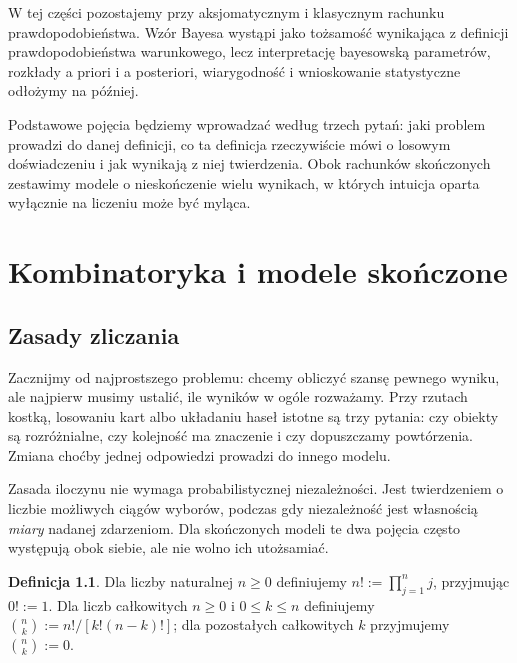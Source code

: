 \documentclass[11pt,a4paper,oneside]{report}
\numberwithin{equation}{chapter}
\theoremstyle{plain}
\theoremstyle{definition}
\newtheorem{definicja}{Definicja}[chapter]
\theoremstyle{remark}
\begin{document}
W tej części pozostajemy przy aksjomatycznym i klasycznym rachunku
prawdopodobieństwa. Wzór Bayesa wystąpi jako tożsamość wynikająca
z definicji prawdopodobieństwa warunkowego, lecz interpretację
bayesowską parametrów, rozkłady a priori i a posteriori,
wiarygodność i wnioskowanie statystyczne odłożymy na później.

Podstawowe pojęcia będziemy wprowadzać według trzech pytań: jaki
problem prowadzi do danej definicji, co ta definicja rzeczywiście
mówi o losowym doświadczeniu i jak wynikają z niej twierdzenia.
Obok rachunków skończonych zestawimy modele o nieskończenie
wielu wynikach, w których intuicja oparta wyłącznie na liczeniu
może być myląca.

\chapter{Kombinatoryka i modele skończone}
\label{ch:combinatorics}

\section{Zasady zliczania}
Zacznijmy od najprostszego problemu: chcemy obliczyć szansę
pewnego wyniku, ale najpierw musimy ustalić, ile wyników w ogóle
rozważamy. Przy rzutach kostką, losowaniu kart albo układaniu haseł
istotne są trzy pytania: czy obiekty są rozróżnialne, czy kolejność
ma znaczenie i czy dopuszczamy powtórzenia. Zmiana choćby jednej
odpowiedzi prowadzi do innego modelu.

Zasada iloczynu nie wymaga probabilistycznej niezależności.
Jest twierdzeniem o liczbie możliwych ciągów wyborów, podczas gdy
niezależność jest własnością \emph{miary} nadanej zdarzeniom.
Dla skończonych modeli te dwa pojęcia często występują obok siebie,
ale nie wolno ich utożsamiać.

\begin{definicja}
Dla liczby naturalnej $n\geq 0$ definiujemy $n!:=\prod_{j=1}^n j$, przyjmując $0!:=1$.
Dla liczb całkowitych $n\geq0$ i $0\leq k\leq n$ definiujemy
$\binom nk:=n!/[k!(n-k)!]$; dla pozostałych całkowitych $k$ przyjmujemy
$\binom nk:=0$.
\end{definicja}
\end{document}
